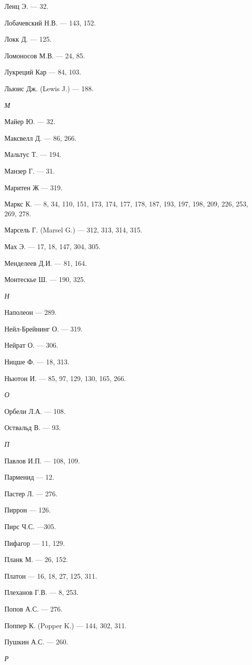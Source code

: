 \documentclass[a4paper,14pt,russian]{extreport}
\begin{document}
Ленц Э. --- 32.

Лобачевский Н.В. --- 143, 152.

Локк Д. --- 125.

Ломоносов М.В. --- 24, 85.

Лукреций Кар --- 84, 103.

Льюис Дж. (Lewis J.) --- 188.

\emph{М}

Майер Ю. --- 32.

Максвелл Д. --- 86, 266.

Мальтус Т. --- 194.

Манзер Г. --- 31.

Маритен Ж --- 319.

Маркс К. --- 8, 34, 110, 151, 173, 174, 177, 178, 187, 193, 197, 198, 209, 226, 253, 269, 278.

Марсель Г. (Marsel G.) --- 312, 313, 314, 315.

Мах Э. --- 17, 18, 147, 304, 305.

Менделеев Д.И. --- 81, 164.

Монтескье Ш. --- 190, 325.

\emph{Н}

Наполеон --- 289.

Нейл-Брейнинг О. --- 319.

Нейрат О. --- 306.

Ницше Ф. --- 18, 313.

Ньютон И. --- 85, 97, 129, 130, 165, 266.

\emph{О}

Орбели Л.А. --- 108.

Оствальд В. --- 93.

\emph{П}

Павлов И.П. --- 108, 109.

Парменид --- 12.

Пастер Л. --- 276.

Пиррон --- 126.

Пирс Ч.С. ---305.

Пифагор --- 11, 129.

Планк М. --- 26, 152.

Платон --- 16, 18, 27, 125, 311.

Плеханов Г.В. --- 8, 253.

Попов А.С. --- 276.

Поппер К. (Popper K.) --- 144, 302, 311.

Пушкин А.С. --- 260.

\emph{Р}
\end{document}
